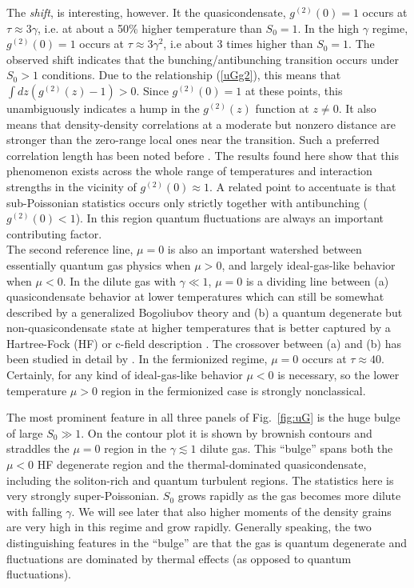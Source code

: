 \documentclass[aps,twocolumn,pra,superscriptaddress,nofootinbib,amsmath,amssymb,floats,floatfix,english]{revtex4-1}
\newcommand{\eqn}[1]{(\ref{#1})}
\begin{document}
The \emph{shift}, is interesting, however. It the quasicondensate, $g^{(2)}(0)=1$ occurs at $\tau\approx 3\gamma$, i.e. at about a 50\% higher temperature than $S_0=1$. In the high $\gamma$ regime,
$g^{(2)}(0)=1$ occurs at $\tau\approx3\gamma^2$, i.e about 3 times higher than $S_0=1$. 
The observed shift indicates 
that the bunching/antibunching transition occurs under $S_0>1$ conditions. Due to the relationship \eqn{uGg2}, this means that $\int dz (g^{(2)}(z)-1)>0$. Since  $g^{(2)}(0)=1$ at these points, this unambiguously indicates a hump in the $g^{(2)}(z)$ function
at $z\ne0$. It also means that density-density correlations at a moderate but nonzero distance are stronger than the zero-range local ones near the transition. Such a preferred correlation length has been noted before \cite{Deuar09,Carusotto01}. The results found here show that this phenomenon
exists across the whole range of temperatures and interaction strengths in the vicinity of $g^{(2)}(0)\approx1$.
A related point to accentuate is that sub-Poissonian statistics occurs only strictly together with antibunching ($g^{(2)}(0)<1$). 
In this region quantum fluctuations are always an important contributing factor.\\

The second reference line, $\mu=0$ is also an important watershed between essentially quantum gas physics when $\mu>0$, and largely ideal-gas-like behavior when $\mu<0$.  
In the dilute gas with $\gamma\ll1$, $\mu=0$ is a dividing line
between (a) quasicondensate behavior at lower temperatures which can still be somewhat described by a generalized Bogoliubov theory \cite{Mora03} and (b) a quantum degenerate but non-quasicondensate state at higher temperatures that is better captured by a Hartree-Fock (HF) or c-field description \cite{Pietraszewicz17}. The crossover between (a) and (b) has been studied in detail by \cite{Henkel17}. In the fermionized regime, $\mu=0$ occurs at $\tau\approx40$. Certainly, for any kind of ideal-gas-like behavior $\mu<0$ is necessary, so the lower temperature $\mu>0$ region in the fermionized case is strongly nonclassical.


The most prominent feature in all three panels of Fig.~\ref{fig:uG} is the huge bulge of large $S_0\gg1$. 
On the contour plot it is shown by brownish contours and straddles the $\mu=0$ region in the $\gamma\lesssim1$ dilute gas. 
This ``bulge''  spans both the $\mu<0$ HF degenerate region and the thermal-dominated quasicondensate, including the soliton-rich and quantum turbulent regions. The statistics here is very strongly super-Poissonian. 
$S_0$ grows rapidly as the gas becomes more dilute with falling $\gamma$. We will see later that also higher moments of the density grains are very high in this regime and grow rapidly. 
Generally speaking, the two distinguishing features in the ``bulge'' are that the gas is quantum degenerate and fluctuations are dominated by thermal effects (as opposed to quantum fluctuations). 
\end{document}
